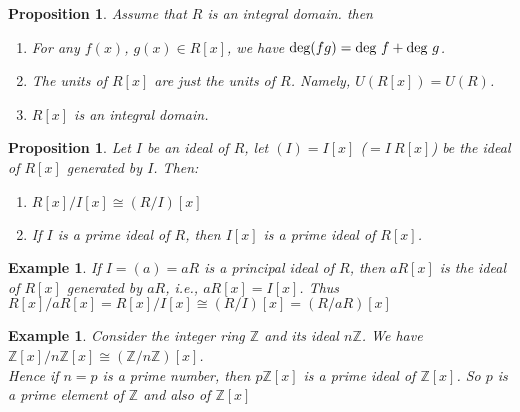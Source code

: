\documentclass[a4paper,8pt]{article}
\newcommand{\Z}{\mathbb{Z}}
\newcommand{\degs}[1]{\textnormal{deg}#1}
\theoremstyle{theorem}
\newtheorem{proposition}[theorem]{Proposition}
\newtheorem{example}[theorem]{Example}
\begin{document}
\begin{proposition}
Assume that $R$ is an integral domain. then
\begin{enumerate}[label=(\roman*)]
\item For any $f(x)$, $g(x) \in R[x]$, we have $\degs(fg) = \degs \ f + \degs \ g$.
\item The units of $R[x]$ are just the units of $R$. Namely, $U(R[x]) = U(R)$.
\item $R[x]$ is an integral domain.
\end{enumerate}
\end{proposition}

\begin{proposition}
Let $I$ be an ideal of $R$, let $(I) = I[x]$ ($=I\ R[x]$) be the ideal of $R[x]$ generated by $I$. Then:
\begin{enumerate}[label=(\roman*)]
\item $R[x] / I[x] \cong (R/I) [x]$
\item If $I$ is a prime ideal of $R$, then $I[x]$ is a prime ideal of $R[x]$.
\end{enumerate}
\end{proposition}

\begin{example}
If $I=(a)=aR$ is a principal ideal of $R$, then $aR[x]$ is the ideal of $R[x]$ generated by $aR$, i.e., $aR[x] = I[x]$. Thus $R[x]/aR[x]=R[x]/I[x] \cong (R/I)[x] = (R/aR) [x]$	
\end{example}

\begin{example}
Consider the integer ring $\Z$ and its ideal $n\Z$. We have $\Z[x]/n\Z[x] \cong (\Z/n\Z)[x]$.\\
Hence if $n=p$ is a prime number, then $p\Z[x]$ is a prime ideal of $\Z[x]$. So $p$ is a prime element of $\Z$ and also of $\Z[x]$
\end{example}
\end{document}
